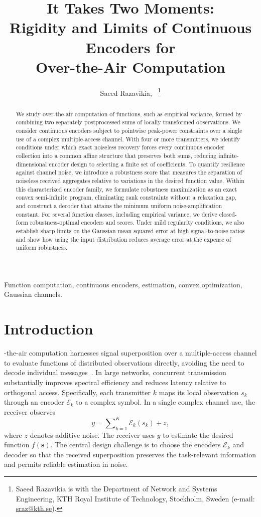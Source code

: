 \documentclass[journal,12pt,onecolumn,draftclsnofoot]{IEEEtran}
\title{It Takes Two Moments: \\ Rigidity and Limits of Continuous Encoders for \\Over-the-Air Computation}
\author{Saeed Razavikia,~\IEEEmembership{Senior Member,~IEEE} \thanks{Saeed Razavikia is with the Department of Network and Systems Engineering, KTH Royal Institute of Technology, Stockholm, Sweden (e-mail: \href{mailto:sraz@kth.se}{sraz@kth.se}).}}
\begin{document}
\maketitle




\begin{abstract}
We study over-the-air computation of functions, such as empirical variance, formed by combining two separately postprocessed sums of locally transformed observations. We consider continuous encoders subject to pointwise peak-power constraints over a single use of a complex multiple-access channel. With four or more transmitters, we identify conditions under which exact noiseless recovery forces every continuous encoder collection into a common affine structure that preserves both sums, reducing infinite-dimensional encoder design to selecting a finite set of coefficients. To quantify resilience against channel noise, we introduce a robustness score that measures the separation of noiseless received aggregates relative to variations in the desired function value. Within this characterized encoder family, we formulate robustness maximization as an exact convex semi-infinite program, eliminating rank constraints without a relaxation gap, and construct a decoder that attains the minimum uniform noise-amplification constant. For several function classes, including empirical variance, we derive closed-form robustness-optimal encoders and scores. Under mild regularity conditions, we also establish sharp limits on the Gaussian mean squared error at high signal-to-noise ratios and show how using the input distribution reduces average error at the expense of uniform robustness.
\end{abstract}






\begin{IEEEkeywords}
Function computation, continuous encoders, estimation, convex optimization, Gaussian channels.
\end{IEEEkeywords}


\section{Introduction}
-the-air computation harnesses signal superposition over a multiple-access channel to evaluate functions of distributed observations directly, avoiding the need to decode individual messages~\cite{sahin2023survey}. In large networks, concurrent transmission substantially improves spectral efficiency and reduces latency relative to orthogonal access. Specifically, each transmitter $k$ maps its local observation $s_k$ through an encoder $\mathscr E_k$ to a complex symbol. In a single complex channel use, the receiver observes
$$
y=\sum\nolimits_{k=1}^{K}\mathscr E_k(s_k)+z,
$$
where $z$ denotes additive noise. The receiver uses $y$ to estimate the desired function $f(\boldsymbol s)$. The central design challenge is to choose the encoders $\mathscr E_k$ and decoder so that the received superposition preserves the task-relevant information and permits reliable estimation in noise.
\end{document}
